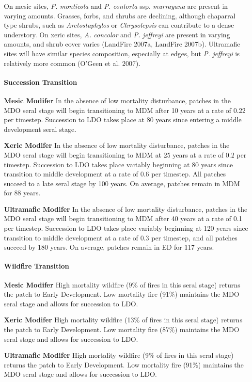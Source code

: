 On mesic sites, \emph{P. monticola} and \emph{P. contorta} ssp. \emph{murrayana} are present in varying amounts. Grasses, forbs, and shrubs are declining, although chaparral type shrubs, such as \emph{Arctostaphylos} or \emph{Chrysolepsis} can contribute to a dense understory. On xeric sites, \emph{A. concolor} and \emph{P. jeffreyi} are present in varying amounts, and shrub cover varies (LandFire 2007a, LandFire 2007b). Ultramafic sites will have similar species composition, especially at edges, but \emph{P. jeffreyi} is relatively more common (O’Geen et al. 2007).


\paragraph{Succession Transition}
\begin{adjustwidth}{2cm}{}
\textbf{Mesic Modifer } In the absence of low mortality disturbance, patches in the MDO seral stage will begin transitioning to MDM after 10 years at a rate of 0.22 per timestep. Succession to LDO takes place at 80 years since entering a middle development seral stage. 

\textbf{Xeric Modifer} In the absence of low mortality disturbance, patches in the MDO seral stage will begin transitioning to MDM at 25 years at a rate of 0.2 per timestep. Succession to LDO takes place variably beginning at 80 years since transition to middle development at a rate of 0.6 per timestep. All patches succeed to a late seral stage by 100 years. On average, patches remain in MDM for 88 years.

\textbf{Ultramafic Modifer} In the absence of low mortality disturbance, patches in the MDO seral stage will begin transitioning to MDM after 40 years at a rate of 0.1 per timestep. Succession to LDO takes place variably beginning at 120 years since transition to middle development at a rate of 0.3 per timestep, and all patches succeed by 180 years. On average, patches remain in ED for 117 years.

\end{adjustwidth}

\paragraph{Wildfire Transition}
\begin{adjustwidth}{2cm}{}
\textbf{Mesic Modifer } High mortality wildfire (9\% of fires in this seral stage) returns the patch to Early Development. Low mortality fire (91\%) maintains the MDO seral stage and allows for succession to LDO.

\textbf{Xeric Modifer}  High mortality wildfire (13\% of fires in this seral stage) returns the patch to Early Development. Low mortality fire (87\%) maintains the MDO seral stage and allows for succession to LDO. 

\textbf{Ultramafic Modifer}  High mortality wildfire (9\% of fires in this seral stage) returns the patch to Early Development. Low mortality fire (91\%) maintains the MDO seral stage and allows for succession to LDO.

\end{adjustwidth}

